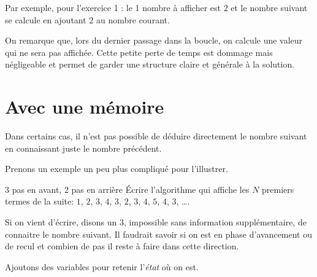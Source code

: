 
Par exemple, pour l'exercice 1 : le 1 nombre à afficher est $2$
et le nombre suivant se calcule en ajoutant $2$ au nombre courant.


On remarque que, lors du dernier passage dans la boucle,
on calcule une valeur qui ne sera pas affichée.
Cette petite perte de temps est dommage mais négligeable
et permet de garder une structure claire et générale à la solution.

\section*{Avec une mémoire}

Dans certains cas,
il n'est pas possible de déduire directement le nombre suivant
en connaissant juste le nombre précédent.

Prenons un exemple un peu plus compliqué pour l'illustrer.

\begin{Exercice}{3 pas en avant, 2 pas en arrière} 
	Écrire l'algorithme qui affiche les $N$ premiers termes
	de la suite: $1$, $2$, $3$, $4$, $3$, $2$, $3$, $4$, $5$, $4$, $3$, \dots.
\end{Exercice}

Si on vient d'écrire, disons un $3$,
impossible sans information supplémentaire,
de connaitre le nombre suivant.
Il faudrait savoir si on est en phase d'avancement ou de recul
et combien de pas il reste à faire dans cette direction.

Ajoutons des variables pour retenir l'\emph{état} où on est.


